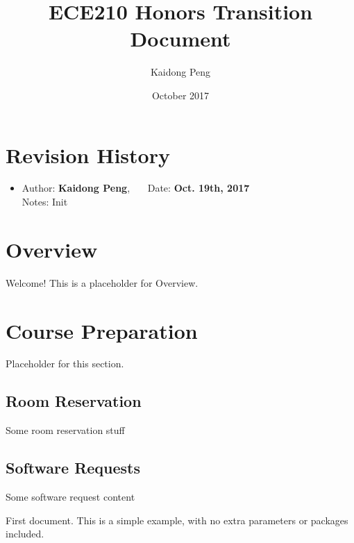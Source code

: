 \documentclass[12pt]{article}
\title{ECE210 Honors Transition Document}
\author{Kaidong Peng}
\date{October 2017}
\makeatletter
\renewcommand\tableofcontents{%
  \null\hfill\textbf{\Large\contentsname}\hfill\null\par
  \@mkboth{\MakeUppercase\contentsname}{\MakeUppercase\contentsname}%
  \@starttoc{toc}%
}
\newcommand{\RevisionHistoryItem}[3]{
    \item {
        Author: \textbf{#1}, \ \ \  Date: \textbf{#2}
    } \\
    Notes: #3
}
\makeatother
\begin{document}
\null  %
\nointerlineskip  %
\vfill
\let\snewpage \newpage
\let\newpage \relax
\maketitle
\let \newpage \snewpage
\vfill
\newpage

\tableofcontents
\newpage

\section{Revision History}
    \begin{itemize}
        \RevisionHistoryItem{Kaidong Peng}{Oct. 19th, 2017}
        {Init}
    \end{itemize}
\newpage

\section{Overview}
    Welcome! This is a placeholder for Overview.
\newpage


\section{Course Preparation}
    Placeholder for this section.
    \subsection{Room Reservation}
        Some room reservation stuff
    \subsection{Software Requests}
        Some software request content
\newpage


   First document. This is a simple example, with no 
   extra parameters or packages included.
\end{document}
